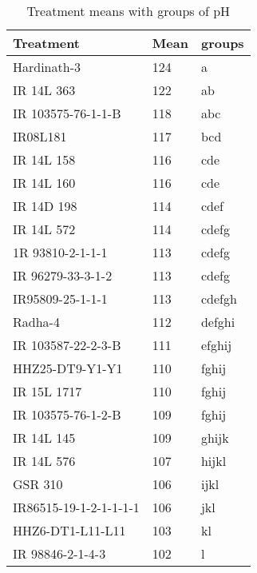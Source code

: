\documentclass[]{article}
\begin{document}
\begin{longtable}{lll}
\caption{\label{tab:two-fac-groups-tab2}Treatment means with groups of pH}\\
\toprule
Treatment & Mean & groups\\
\midrule
\rowcolor{gray!6}  Hardinath-3 & 124 & a\\
IR 14L 363 & 122 & ab\\
\rowcolor{gray!6}  IR 103575-76-1-1-B & 118 & abc\\
IR08L181 & 117 & bcd\\
\rowcolor{gray!6}  IR 14L 158 & 116 & cde\\
\addlinespace
IR 14L 160 & 116 & cde\\
\rowcolor{gray!6}  IR 14D 198 & 114 & cdef\\
IR 14L 572 & 114 & cdefg\\
\rowcolor{gray!6}  1R 93810-2-1-1-1 & 113 & cdefg\\
IR 96279-33-3-1-2 & 113 & cdefg\\
\addlinespace
\rowcolor{gray!6}  IR95809-25-1-1-1 & 113 & cdefgh\\
Radha-4 & 112 & defghi\\
\rowcolor{gray!6}  IR 103587-22-2-3-B & 111 & efghij\\
HHZ25-DT9-Y1-Y1 & 110 & fghij\\
\rowcolor{gray!6}  IR 15L 1717 & 110 & fghij\\
\addlinespace
IR 103575-76-1-2-B & 109 & fghij\\
\rowcolor{gray!6}  IR 14L 145 & 109 & ghijk\\
IR 14L 576 & 107 & hijkl\\
\rowcolor{gray!6}  GSR 310 & 106 & ijkl\\
IR86515-19-1-2-1-1-1-1 & 106 & jkl\\
\addlinespace
\rowcolor{gray!6}  HHZ6-DT1-L11-L11 & 103 & kl\\
IR 98846-2-1-4-3 & 102 & l\\
\bottomrule
\end{longtable}
\endgroup{}
\begingroup\fontsize{12}{14}\selectfont
\end{document}
